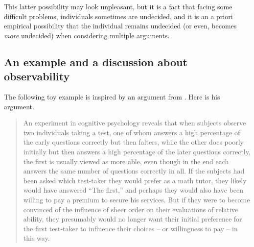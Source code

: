 \documentclass[version=last, pagesize, twoside=off, bibliography=totoc, DIV=calc, fontsize=12pt, a4paper, french, english]{scrartcl}
\begin{document}
This latter possibility may look unpleasant, but it is a fact that facing some difficult problems, individuals sometimes are undecided, and it is an a priori empirical possibility that the individual remains undecided (or even, becomes \emph{more} undecided) when considering multiple arguments. 

\subsection{An example and a discussion about observability}
The following toy example is inspired by an argument from \citet[p.~59]{railton_facts_2003}. Here is his argument.
\begin{quote}
An experiment in cognitive psychology reveals that when subjects observe two individuals taking a test, one of whom answers a high percentage of the early questions correctly but then falters, while the other does
poorly initially but then answers a high percentage of the later questions
correctly, the first is usually viewed as more able, even though in the end
each answers the same number of questions correctly in all. If the subjects had been asked which test-taker they would prefer as a math tutor,
they likely would have answered “The first,” and perhaps they would also
have been willing to pay a premium to secure his services. But if they
were to become convinced of the influence of sheer order on their evaluations of relative ability, they presumably would no longer want their
initial preference for the first test-taker to influence their choices – or
willingness to pay – in this way.
\end{quote}
\end{document}
